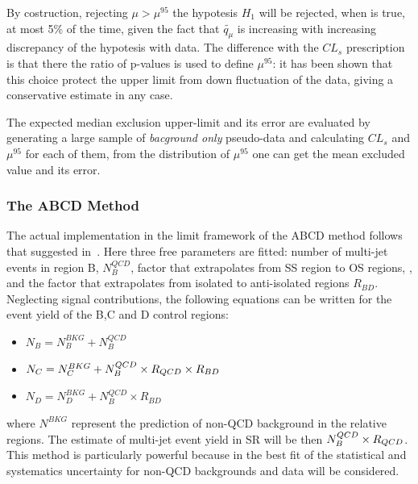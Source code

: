 By costruction, rejecting $\mu > \mu^{95}$ the hypotesis $H_1$ will be rejected, when is true, at most 5\% of the time,
given the fact that $\tilde{q_{\mu}}$ is increasing with increasing discrepancy of the hypotesis with data.
The difference with the $CL_{s}$ prescription is that there the ratio of p-values is used to define $\mu^{95}$: 
it has been shown that this choice protect the upper limit from down fluctuation of the data, giving a conservative
estimate in any case.
%
%
%	
%

The expected median exclusion upper-limit and its error are evaluated by generating a large sample of \emph{bacground only}
pseudo-data and calculating $CL_s$ and $\mu^{95}$ for each of them, from the distribution of  $\mu^{95}$ one can get the mean
excluded value and its error.

\subsubsection{The ABCD Method}
The actual implementation in the limit framework of the ABCD method follows that suggested in~\cite{ABCD}.
Here three free parameters are fitted: number of multi-jet events in region B, $N_{B}^{QCD}$, factor that extrapolates from SS region to OS regions, \rqcd, and the factor that 
extrapolates from isolated to anti-isolated regions $R_{BD}$. Neglecting signal contributions, the following 
equations can be written for the event yield of the B,C and D control regions:
\begin{itemize}
\item[] $N_{B} = N_{B}^{BKG} + N_{B}^{QCD}$
\item[] $N_{C} = N_{C}^{BKG} +  N_{B}^{QCD} \times R_{QCD} \times R_{BD} $
\item[] $N_{D} =  N_{D}^{BKG} + N_{B}^{QCD} \times  R_{BD} $
\end{itemize}
where $N^{BKG}$ represent the prediction of  non-QCD background in the relative regions.
The estimate of multi-jet event yield in SR will be then $ N_{B}^{QCD} \times R_{QCD} $. This method is 
particularly powerful because in the best fit of \rqcd the statistical 
and systematics uncertainty for non-QCD backgrounds and data will be considered.


